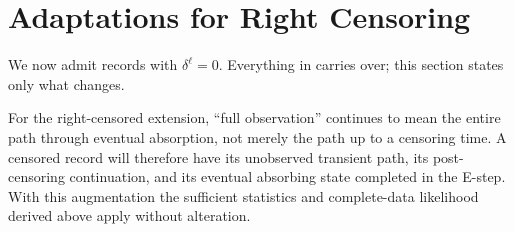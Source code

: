 \documentclass{article}
\newenvironment{rcrevision}{}{}
\newenvironment{aarevision}{}{}
\begin{document}
\section{Adaptations for Right Censoring}
\label{sec:censoring}
\label{sec:em-censored}

\begin{aarevision}
We now admit records with $\delta^\ell=0$. Everything in  carries over; this section states only what changes.
\end{aarevision}

\begin{rcrevision}
For the right-censored extension, ``full observation'' continues to mean the entire path through eventual absorption, not merely the path up to a censoring time. A censored record will therefore have its unobserved transient path, its post-censoring continuation, and its eventual absorbing state completed in the E-step. With this augmentation the sufficient statistics and complete-data likelihood derived above apply without alteration.
\end{rcrevision}
\end{document}
